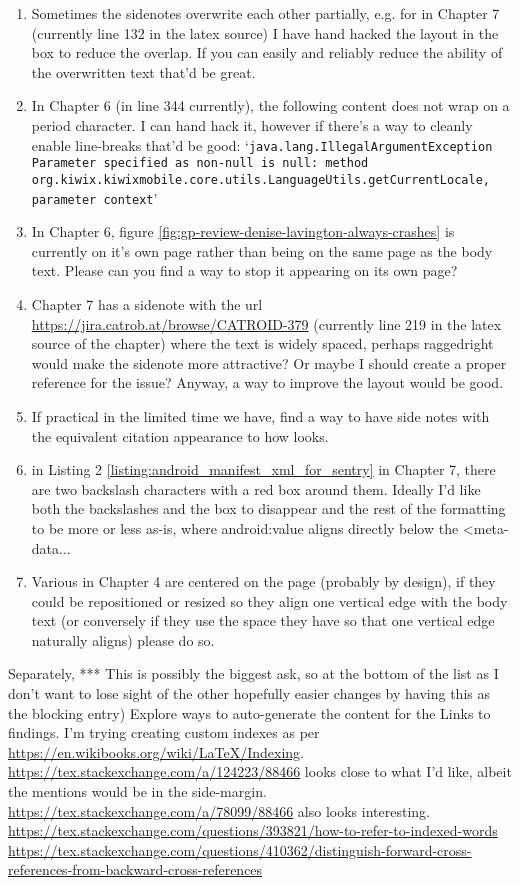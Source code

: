 \begin{enumerate}
    \item Sometimes the sidenotes overwrite each other partially, e.g. for  in Chapter 7 (currently line 132 in the latex source) I have hand hacked the layout in the box to reduce the overlap. If you can easily and reliably reduce the ability of the overwritten text that'd be great.
    \item In Chapter 6 (in line 344 currently), the following  content does not wrap on a period character. I can hand hack it, however if there's a way to cleanly enable line-breaks that'd be good: `\texttt{java.lang.IllegalArgumentException Parameter specified as non-null is null: method org.kiwix.kiwixmobile.core.utils.LanguageUtils.getCurrentLocale, parameter context}'
    \item In Chapter 6, figure \ref{fig:gp-review-denise-lavington-always-crashes} is currently on it's own page rather than being on the same page as the body text. Please can you find a way to stop it appearing on its own page?  
    \item Chapter 7 has a sidenote with the url \url{https://jira.catrob.at/browse/CATROID-379} (currently line 219 in the latex source of the chapter) where the text is widely spaced, perhaps raggedright would make the sidenote more attractive? Or maybe I should create a proper reference for the issue? Anyway, a way to improve the layout would be good.
    \item If practical in the limited time we have, find a way to have side notes with the equivalent citation appearance to how  looks.
    \item in Listing 2 \ref{listing:android_manifest_xml_for_sentry} in Chapter 7, there are two backslash characters with a red box around them. Ideally I'd like both the backslashes and the box to disappear and the rest of the formatting to be more or less as-is, where android:value aligns directly below the <meta-data... 
    \item Various  in Chapter 4 are centered on the page (probably by design), if they could be repositioned or resized so they align one vertical edge with the body text (or conversely if they use the space they have so that one vertical edge naturally aligns) please do so. 
\end{enumerate}

Separately, *** This is possibly the biggest ask, so at the bottom of the list as I don't want to lose sight of the other hopefully easier changes by having this as the blocking entry) Explore ways to auto-generate the content for the Links to findings. I'm trying creating custom indexes as per \url{https://en.wikibooks.org/wiki/LaTeX/Indexing}. \url{https://tex.stackexchange.com/a/124223/88466} looks close to what I'd like, albeit the mentions would be in the side-margin. \url{https://tex.stackexchange.com/a/78099/88466} also looks interesting. \url{https://tex.stackexchange.com/questions/393821/how-to-refer-to-indexed-words} \url{https://tex.stackexchange.com/questions/410362/distinguish-forward-cross-references-from-backward-cross-references}

